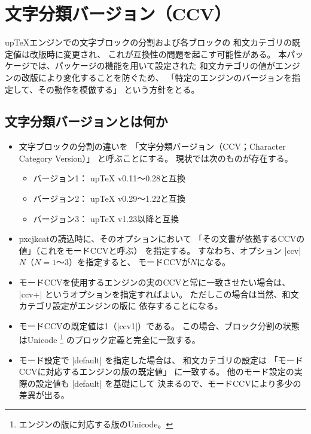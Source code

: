 \documentclass[uplatex,dvipdfmx,a4paper]{jsarticle}
\newcommand{\Pkg}[1]{\textsf{#1}}
\newcommand{\strong}{\textsf}
\providecommand{\pTeX}{p\TeX}
\providecommand{\upTeX}{u\pTeX}
\begin{document}
\section{文字分類バージョン（CCV）}
\label{sec:CCV}

{\upTeX}エンジンでの文字ブロックの分割および各ブロックの
和文カテゴリの既定値は改版時に変更され、
これが互換性の問題を起こす可能性がある。
本パッケージでは、パッケージの機能を用いて設定された
和文カテゴリの値がエンジンの改版により変化することを防ぐため、
「特定のエンジンのバージョンを指定して、その動作を模倣する」
という方針をとる。

\subsection{文字分類バージョンとは何か}

\begin{itemize}
\item 文字ブロックの分割の違いを
  「\strong{文字分類バージョン}（CCV；Character Category Version）」
  と呼ぶことにする。
  現状では次のものが存在する。
  \begin{itemize}
  \item バージョン1： {\upTeX} v0.11～0.28と互換
  \item バージョン2： {\upTeX} v0.29～1.22と互換
  \item バージョン3： {\upTeX} v1.23以降と互換
  \end{itemize}

\item \Pkg{pxcjkcat}の読込時に、そのオプションにおいて
  「その文書が依拠するCCVの値」（これを\strong{モードCCV}と呼ぶ）
  を指定する。
  すなわち、オプション |ccv|$N$（$N=\mbox{1～3}$）を指定すると、
  モードCCVが$N$になる。

\item モードCCVを使用するエンジンの実のCCVと常に一致させたい場合は、
  |ccv+| というオプションを指定すればよい。
  ただしこの場合は当然、和文カテゴリ設定がエンジンの版に
  依存することになる。

\item モードCCVの既定値は1（|ccv1|）である。
  この場合、ブロック分割の状態はUnicode%
  \footnote{エンジンの版に対応する版のUnicode。}%
  のブロック定義と完全に一致する。

\item モード設定で |default| を指定した場合は、
  和文カテゴリの設定は
  「モードCCVに対応するエンジンの版の既定値」
  に一致する。
  他のモード設定の実際の設定値も |default| を基礎にして
  決まるので、モードCCVにより多少の差異が出る。

\end{itemize}
\end{document}
